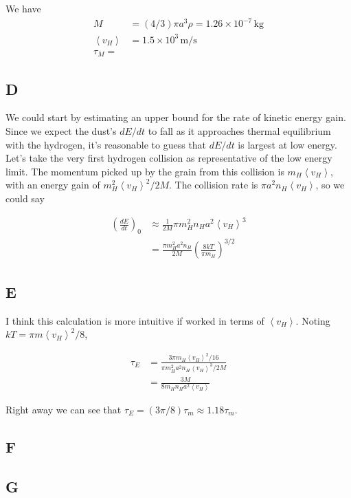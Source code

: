 \documentclass[12pt]{article}
\newcommand{\av}[1]{\left\langle #1 \right\rangle}
\begin{document}
We have 
\begin{align*}
M &= (4/3)\pi a^3 \rho = 1.26 \times 10^{-7} \,\mathrm{kg}\\
\av{v_H} &= 1.5 \times 10^3 \, \mathrm{m}/\mathrm{s}\\
\tau_M = 
\end{align*}

\subsection*{D}

We could start by estimating an upper bound for the rate of kinetic energy gain. Since we expect the dust's \(dE/dt\) to fall as it approaches thermal equilibrium with the hydrogen, it's reasonable to guess that \(dE/dt\) is largest at low energy. Let's take the very first hydrogen collision as representative of the low energy limit. The momentum picked up by the grain from this collision is \(m_H \av{v_H}\), with an energy gain of \(m_H^2\av{v_H}^2/2M\). The collision rate is \(\pi a^2 n_H \av{v_H}\), so we could say

\begin{align*}
\left(\frac{dE}{dt}\right)_0 &\approx \frac{1}{2M}\pi m_H^2 n_H a ^2 \av{v_H}^3 \\
&= \frac{\pi m_H^2 a^2 n_H}{2M}\left( \frac{8kT}{\pi m_H}\right)^{3/2}
\end{align*}

\subsection*{E}

I think this calculation is more intuitive if worked in terms of \(\av{v_H}\). Noting \( kT = \pi m\av{v_H}^2/8 \), 

\begin{align*}
\tau_E &= \frac{3\pi m_H \av{v_H}^2/16}{  \pi m_H^2 a^2 n_H \av{v_H}^3/ 2M} \\[12pt]
&= \frac{3M}{8m_Hn_Ha^2\av{v_H}}
\end{align*}

Right away we can see that \(\tau_E = (3\pi/8)\tau_m \approx 1.18 \tau_m\).

\subsection*{F}

\subsection*{G}
\end{document}
